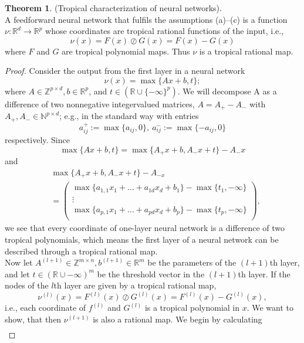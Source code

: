 \documentclass{article}
\theoremstyle{definition}
\newtheorem{theorem}{Theorem}[section]
\begin{document}
\begin{theorem}\cite{zhang2018tropical}
\label{teo:trop_char_of_neur_net}
(Tropical characterization of neural networks). \\
A feedforward neural network that fulfils the assumptions (a)–(c)
is a function $\nu : \mathbb{R}^{d} \to \mathbb{R}^{p}$ whose coordinates are tropical rational functions of the input, i.e.,
$$ \nu(x) = F(x) \oslash G(x) = F(x) - G(x) $$
where $F$ and $G$ are tropical polynomial maps. Thus $\nu$ is a tropical rational map.
\end{theorem}
\begin{proof}Consider the output from the first layer in a neural network
$$ \nu(x) = \max \{ Ax+b, t \}; $$
where $A \in \mathbb{Z}^{p \times d}, b \in \mathbb{R}^{p}$, and $t \in (\mathbb{R} \cup \{ - \infty \}^{p})$. We will
decompose A as a difference of two nonnegative integervalued matrices, $A = A_{+} - A_{-}$ with $A_{+},A_{-} \in \mathbb{N}^{p \times d}$; e.g., in the standard way with entries
$$ a^{+}_{ij} := \max \{ a_{ij}, 0 \}, \ a^{-}_{ij} := \max \{ -a_{ij}
 , 0\} $$
respectively. Since
$$ \max \{ Ax + b, t \} = \max \{ A_{+}x+b, A_{-}x+t \} - A_{-}x$$
and
\begin{align*}
&\max \{ A_{+}x+b, A_{-}x+t \} - A_{-x} \\ &= 
 \begin{pmatrix}
  \max\{a_{1,1}x_{1} + \dots + a_{1d}x_{d} + b_1\} - \max\{t_{1},-\infty\}  \\
  \vdots \\
  \max\{a_{p,1}x_{1} + \dots + a_{pd}x_{d} + b_p\} - \max\{t_{p},-\infty\}  \\ 
 \end{pmatrix},
\end{align*}
we see that every coordinate of one-layer neural network
is a difference of two tropical polynomials, which means the first layer of a neural network can be described through a tropical rational map. \\
Now let $A^{(l+1)} \in \mathbb{Z}^{m \times n}, b^{(l+1)} \in \mathbb{R}^{m}$ be the parameters of the $(l+1)$th layer, and let $t \in (\mathbb{R} \cup {- \infty})^{m}$ be the threshold vector in the $(l+1)$th layer. If the nodes of the $l$th layer are given by a tropical rational map,
$$ \nu^{(l)}(x) = F^{(l)}(x) \oslash G^{(l)}(x) = F^{(l)}(x)-G^{(l)}(x),$$
i.e., each coordinate of $f^{(l)}$ and $G^{(l)}$ is a tropical polynomial in $x$. We want to show, that then $\nu^{(l+1)}$ is also a rational map. We begin by calculating
\begin{align*}

\end{align*}
\end{proof}
\end{document}
